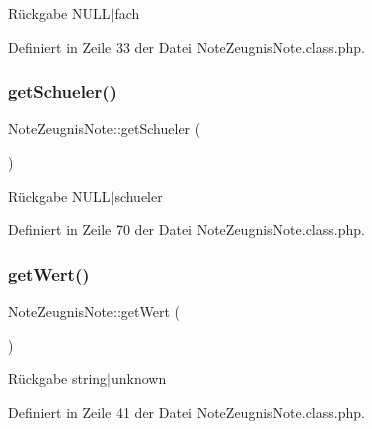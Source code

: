 \begin{DoxyReturn}{Rückgabe}
N\+U\+L\+L$\vert$fach 
\end{DoxyReturn}


Definiert in Zeile 33 der Datei Note\+Zeugnis\+Note.\+class.\+php.

\mbox{\label{class_note_zeugnis_note_a5cf0587b3c76321ccb06fcde0abb3dc2}} 
\subsubsection{\texorpdfstring{get\+Schueler()}{getSchueler()}}
{\footnotesize\ttfamily Note\+Zeugnis\+Note\+::get\+Schueler (\begin{DoxyParamCaption}{ }\end{DoxyParamCaption})}

\begin{DoxyReturn}{Rückgabe}
N\+U\+L\+L$\vert$schueler 
\end{DoxyReturn}


Definiert in Zeile 70 der Datei Note\+Zeugnis\+Note.\+class.\+php.

\mbox{\label{class_note_zeugnis_note_aaf307e9d16fd09108b2e8497c3b07f3a}} 
\subsubsection{\texorpdfstring{get\+Wert()}{getWert()}}
{\footnotesize\ttfamily Note\+Zeugnis\+Note\+::get\+Wert (\begin{DoxyParamCaption}{ }\end{DoxyParamCaption})}

\begin{DoxyReturn}{Rückgabe}
string$\vert$unknown 
\end{DoxyReturn}


Definiert in Zeile 41 der Datei Note\+Zeugnis\+Note.\+class.\+php.

\mbox{\label{class_note_zeugnis_note_af893cb280aafb2ea282d485810d3ad9c}} 
